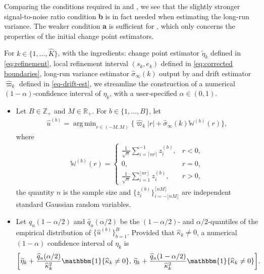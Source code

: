 \documentclass[11pt]{article}
\DeclareMathOperator*{\argmin}{arg\,min}
\theoremstyle{plain}
\theoremstyle{definition}
\begin{document}
Comparing the conditions required in  and , we see that the slightly stronger signal-to-noise ratio condition \textbf{b} is in fact needed when estimating the long-run variance.  The weaker condition \textbf{a} is sufficient for , which only concerns the properties of the initial change point estimators.


For $k \in \{1, \ldots, \widehat{K}\}$, with the ingredients: change point estimator $\widetilde{\eta}_k$ defined in \eqref{eq:refinement}, local refinement interval $(s_k, e_k)$ defined in \eqref{eq:corrected boundaries}, long-run variance estimator $\widehat{\sigma}_{\infty}(k)$ output by  and drift estimator $\widehat{\varpi}_k$ defined in \eqref{eq-drift-est}, we streamline the construction of a numerical $(1-\alpha)$-confidence interval of $\eta_k$, with a user-specified $\alpha \in (0, 1)$. 

\begin{itemize}
    \item [Step 1.] Let $B\in \mathbb{Z}_+$ and $M \in \mathbb{R}_+$.  For $b \in \{1, \ldots, B\}$, let
        \begin{align}\label{eq:simu_est}
            \widehat{u}^{(b)} = \argmin_{r \in (-M, M)} \big\{\widehat{\varpi}_k|r| + \widehat{\sigma}_{\infty}(k)\mathbb{W}^{(b)}(r)\big\},
        \end{align}
        where
        \begin{align*}
            \mathbb{W}^{(b)}(r) = \begin{cases}
                \frac{1}{\sqrt{n}}\sum_{i = \lceil nr \rceil}^{-1}z_i^{(b)}, & r < 0,\\
                0, & r = 0,\\
                \frac{1}{\sqrt{n}}\sum_{i = 1}^{\lfloor nr \rfloor}z_i^{(b)}, & r > 0, 
            \end{cases}
        \end{align*}
        the quantity $n$ is the sample size and $\{z_i^{(b)}\}_{i = -\lfloor nM \rfloor}^{\lceil nM \rceil}$ are independent standard Gaussian random variables. 
    \item [Step 2.] Let $\widehat{q}_u(1-\alpha/2)$ and $\widehat{q}_u(\alpha/2)$ be the $(1-\alpha/2)$- and $\alpha/2$-quantiles of the empirical distribution of $\{\widehat{u}^{(b)}\}_{b = 1}^B$.  Provided that $\widehat{\kappa}_k \neq 0$, a numerical $(1-\alpha)$ confidence interval of $\eta_k$ is 
    \begin{align}\label{eq-CI-cons}
        \bigg[\widetilde{\eta}_k + \frac{\widehat{q}_u(\alpha/2)}{\widehat{\kappa}_k^2}\mathbbm{1}\{\widehat{\kappa}_k \neq 0\}, \, \widetilde{\eta}_k + \frac{\widehat{q}_u(1-\alpha/2)}{\widehat{\kappa}_k^2}\mathbbm{1}\{\widehat{\kappa}_k \neq 0\} \bigg].
    \end{align}
\end{itemize}
\end{document}
